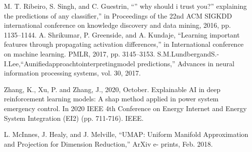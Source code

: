 \documentclass[10pt, conference, a4paper, final]{IEEEtran}
\begin{document}
\begin{thebibliography}{01}
 M. T. Ribeiro, S. Singh, and C. Guestrin, “” why should i trust you?” explaining the predictions of any classifier,” in Proceedings of the 22nd ACM SIGKDD international conference on knowledge discovery and data mining, 2016, pp. 1135–1144.
 A. Shrikumar, P. Greenside, and A. Kundaje, “Learning important features through propagating activation differences,” in International conference on machine learning. PMLR, 2017, pp. 3145–3153.
 S.M.LundbergandS.-I.Lee,“Aunifiedapproachtointerpretingmodel predictions,” Advances in neural information processing systems, vol. 30, 2017.

Zhang, K., Xu, P. and Zhang, J., 2020, October. Explainable AI in deep reinforcement learning models: A shap method applied in power system emergency control. In 2020 IEEE 4th Conference on Energy Internet and Energy System Integration (EI2) (pp. 711-716). IEEE.






	L. McInnes, J. Healy, and J. Melville, “UMAP: Uniform Manifold Approximation and Projection for Dimension Reduction,” ArXiv e- prints, Feb. 2018.
  
 
\end{thebibliography}
\appendix
\end{document}
